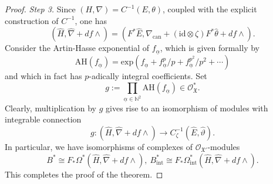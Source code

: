 \documentclass[12pt, a4paper]{article}
\begin{document}
\begin{proof}
{\itshape Step 3.} Since $(H,\nabla)=C^{-1}(E,\theta)$, coupled with the explicit construction of $C^{-1}$, one has
$$
(\hat H,\hat\nabla+df\wedge)=(F^*\hat E,\nabla_\mathrm{can}+(\mathrm{id}\otimes\zeta)F^*\hat\theta+df\wedge).
$$
Consider the Artin-Hasse exponential of $f_{\underline{\alpha}}$, which is given formally by
$$
\mathrm{AH}(f_{\underline{\alpha}})=\mathrm{exp}(f_{\underline{\alpha}}+f_{\underline{\alpha}}^p/p+f_{\underline{\alpha}}^{p^2}/p^2+\cdots)
$$
and which in fact has $p$-adically integral coefficients. Set
$$
g:=\prod_{\underline\alpha\in\mathbb N^2}\mathrm{AH}(f_{\underline\alpha})\in\mathcal O^*_{\mathfrak X}.
$$
Clearly, multiplication by $g$ gives rise to an isomorphism of modules with integrable connection
$$
g:(\hat H,\hat\nabla+df\wedge)\to C_\zeta^{-1}(\hat E,\hat\vartheta).
$$
In particular, we have isomorphisms of complexes of $\mathcal O_{\mathfrak X'}$-modules
$$
B^*\cong F_*\Omega^*(\hat H,\hat\nabla+df\wedge),~B_\mathrm{int}^*\cong F_*\Omega_\mathrm{int}^*(\hat H,\hat\nabla+df\wedge).$$
This completes the proof of the theorem.

\end{proof}
\end{document}
